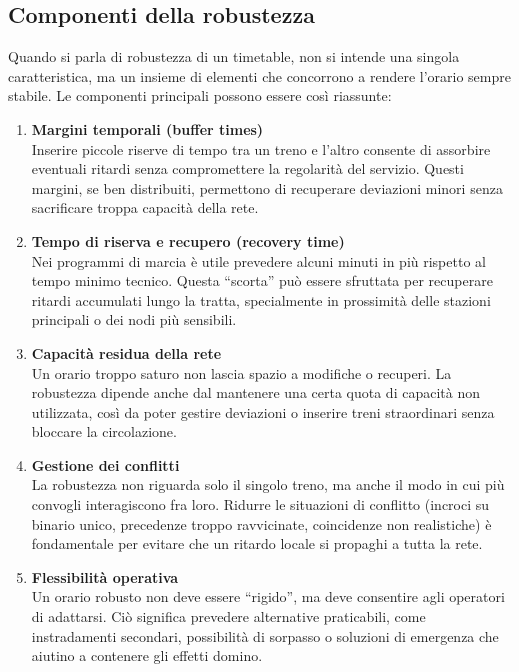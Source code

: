 \documentclass[a4paper,12pt]{report}
\begin{document}
\subsection{Componenti della robustezza}
Quando si parla di robustezza di un timetable, non si intende una singola caratteristica, ma un insieme di elementi che concorrono a rendere l’orario sempre stabile. Le componenti principali possono essere così riassunte:

\begin{enumerate}

    \item \textbf{Margini temporali (buffer times)} \\
    Inserire piccole riserve di tempo tra un treno e l’altro consente di assorbire eventuali ritardi senza compromettere la regolarità del servizio. Questi margini, se ben distribuiti, permettono di recuperare deviazioni minori senza sacrificare troppa capacità della rete.

    \item \textbf{Tempo di riserva e recupero (recovery time)} \\
    Nei programmi di marcia è utile prevedere alcuni minuti in più rispetto al tempo minimo tecnico. Questa “scorta” può essere sfruttata per recuperare ritardi accumulati lungo la tratta, specialmente in prossimità delle stazioni principali o dei nodi più sensibili.

    \item \textbf{Capacità residua della rete} \\
    Un orario troppo saturo non lascia spazio a modifiche o recuperi. La robustezza dipende anche dal mantenere una certa quota di capacità non utilizzata, così da poter gestire deviazioni o inserire treni straordinari senza bloccare la circolazione.

    \item \textbf{Gestione dei conflitti} \\
    La robustezza non riguarda solo il singolo treno, ma anche il modo in cui più convogli interagiscono fra loro. Ridurre le situazioni di conflitto (incroci su binario unico, precedenze troppo ravvicinate, coincidenze non realistiche) è fondamentale per evitare che un ritardo locale si propaghi a tutta la rete.

    \item \textbf{Flessibilità operativa} \\
    Un orario robusto non deve essere “rigido”, ma deve consentire agli operatori di adattarsi. Ciò significa prevedere alternative praticabili, come instradamenti secondari, possibilità di sorpasso o soluzioni di emergenza che aiutino a contenere gli effetti domino.

    \end{enumerate}
    
\end{document}
